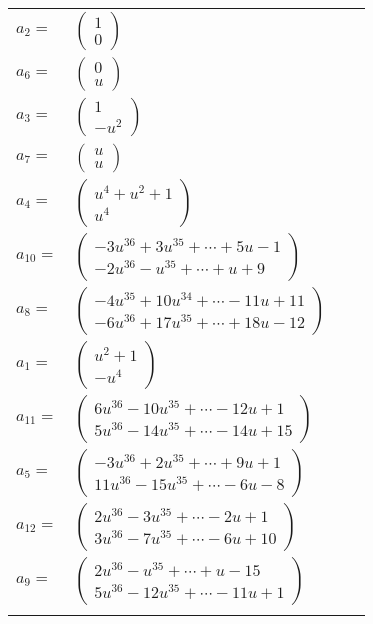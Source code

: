 \documentclass[1p]{elsarticle_modified}
\theoremstyle{definition}
\begin{document}
\begin{tabular}{m{7pt} m{180pt} m{7pt} m{180pt} }
\flushright $a_{2}=$&$\begin{pmatrix}1\\0\end{pmatrix}$ \\
\flushright $a_{6}=$&$\begin{pmatrix}0\\u\end{pmatrix}$ \\
\flushright $a_{3}=$&$\begin{pmatrix}1\\- u^2\end{pmatrix}$ \\
\flushright $a_{7}=$&$\begin{pmatrix}u\\u\end{pmatrix}$ \\
\flushright $a_{4}=$&$\begin{pmatrix}u^4+u^2+1\\u^4\end{pmatrix}$ \\
\flushright $a_{10}=$&$\begin{pmatrix}-3 u^{36}+3 u^{35}+\cdots+5 u-1\\-2 u^{36}- u^{35}+\cdots+u+9\end{pmatrix}$ \\
\flushright $a_{8}=$&$\begin{pmatrix}-4 u^{35}+10 u^{34}+\cdots-11 u+11\\-6 u^{36}+17 u^{35}+\cdots+18 u-12\end{pmatrix}$ \\
\flushright $a_{1}=$&$\begin{pmatrix}u^2+1\\- u^4\end{pmatrix}$ \\
\flushright $a_{11}=$&$\begin{pmatrix}6 u^{36}-10 u^{35}+\cdots-12 u+1\\5 u^{36}-14 u^{35}+\cdots-14 u+15\end{pmatrix}$ \\
\flushright $a_{5}=$&$\begin{pmatrix}-3 u^{36}+2 u^{35}+\cdots+9 u+1\\11 u^{36}-15 u^{35}+\cdots-6 u-8\end{pmatrix}$ \\
\flushright $a_{12}=$&$\begin{pmatrix}2 u^{36}-3 u^{35}+\cdots-2 u+1\\3 u^{36}-7 u^{35}+\cdots-6 u+10\end{pmatrix}$ \\
\flushright $a_{9}=$&$\begin{pmatrix}2 u^{36}- u^{35}+\cdots+u-15\\5 u^{36}-12 u^{35}+\cdots-11 u+1\end{pmatrix}$\\&\end{tabular}
\end{document}
